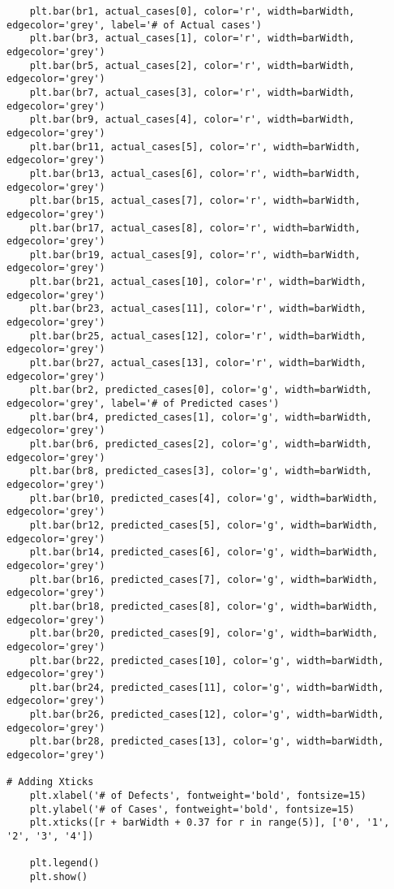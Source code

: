 \documentclass[a4 paper]{article}
\numberwithin{equation}{section}
\newcommand{\0}{\mathbf{0}}
\begin{document}
\begin{itemize}
\begin{lstlisting}
    plt.bar(br1, actual_cases[0], color='r', width=barWidth, edgecolor='grey', label='# of Actual cases')
    plt.bar(br3, actual_cases[1], color='r', width=barWidth, edgecolor='grey')
    plt.bar(br5, actual_cases[2], color='r', width=barWidth, edgecolor='grey')
    plt.bar(br7, actual_cases[3], color='r', width=barWidth, edgecolor='grey')
    plt.bar(br9, actual_cases[4], color='r', width=barWidth, edgecolor='grey')
    plt.bar(br11, actual_cases[5], color='r', width=barWidth, edgecolor='grey')
    plt.bar(br13, actual_cases[6], color='r', width=barWidth, edgecolor='grey')
    plt.bar(br15, actual_cases[7], color='r', width=barWidth, edgecolor='grey')
    plt.bar(br17, actual_cases[8], color='r', width=barWidth, edgecolor='grey')
    plt.bar(br19, actual_cases[9], color='r', width=barWidth, edgecolor='grey')
    plt.bar(br21, actual_cases[10], color='r', width=barWidth, edgecolor='grey')
    plt.bar(br23, actual_cases[11], color='r', width=barWidth, edgecolor='grey')
    plt.bar(br25, actual_cases[12], color='r', width=barWidth, edgecolor='grey')
    plt.bar(br27, actual_cases[13], color='r', width=barWidth, edgecolor='grey')
    plt.bar(br2, predicted_cases[0], color='g', width=barWidth, edgecolor='grey', label='# of Predicted cases')
    plt.bar(br4, predicted_cases[1], color='g', width=barWidth, edgecolor='grey')
    plt.bar(br6, predicted_cases[2], color='g', width=barWidth, edgecolor='grey')
    plt.bar(br8, predicted_cases[3], color='g', width=barWidth, edgecolor='grey')
    plt.bar(br10, predicted_cases[4], color='g', width=barWidth, edgecolor='grey')
    plt.bar(br12, predicted_cases[5], color='g', width=barWidth, edgecolor='grey')
    plt.bar(br14, predicted_cases[6], color='g', width=barWidth, edgecolor='grey')
    plt.bar(br16, predicted_cases[7], color='g', width=barWidth, edgecolor='grey')
    plt.bar(br18, predicted_cases[8], color='g', width=barWidth, edgecolor='grey')
    plt.bar(br20, predicted_cases[9], color='g', width=barWidth, edgecolor='grey')
    plt.bar(br22, predicted_cases[10], color='g', width=barWidth, edgecolor='grey')
    plt.bar(br24, predicted_cases[11], color='g', width=barWidth, edgecolor='grey')
    plt.bar(br26, predicted_cases[12], color='g', width=barWidth, edgecolor='grey')
    plt.bar(br28, predicted_cases[13], color='g', width=barWidth, edgecolor='grey')

# Adding Xticks
    plt.xlabel('# of Defects', fontweight='bold', fontsize=15)
    plt.ylabel('# of Cases', fontweight='bold', fontsize=15)
    plt.xticks([r + barWidth + 0.37 for r in range(5)], ['0', '1', '2', '3', '4'])

    plt.legend()
    plt.show()		
		\end{lstlisting}
		
	\end{itemize}
	
	
	
	
\end{document}
